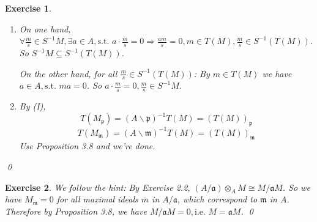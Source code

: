 \documentclass{article}
\theoremstyle{breakstyle}
\newtheorem{exercise}{Exercise}
\begin{document}
\begin{exercise}
    \leavevmode \vspace{-\baselineskip}
    \begin{enumerate}[label=({\Roman*})]
        \item 
            On one hand, $\forall \frac{m}{s}\in S^{-1}M,\exists a\in A,\text{s.t. }a\cdot \frac{m}{s}=0\Rightarrow \frac{am}{s}=0,m\in T(M),\frac{m}{s}\in S^{-1}(T(M))$.
            So $S^{-1}M\subseteq S^{-1}(T(M))$.

            On the other hand, for all $ \frac{m}{s}\in S^{-1}(T(M))$:
            By $m\in T(M)$ we have $a\in A,\text{s.t. }ma=0$.
            So $a\cdot \frac{m}{s}=0,\frac{m}{s}\in S^{-1}M$.
        \item 
            By \emph{(I)},
            $$
            T(M_{\mathfrak{p}})=(A\backslash \mathfrak{p})^{-1}T(M)=\left( T(M) \right) _{\mathfrak{p}}
            $$
            $$
            T(M_{\mathfrak{m}})=(A\backslash \mathfrak{m})^{-1}T(M)=\left( T(M) \right) _{\mathfrak{m}}
            $$
            Use \emph{Proposition 3.8} and we're done.
    \end{enumerate}
    \qed
\end{exercise}

\begin{exercise}
    We follow the hint:
    By \emph{Exercise 2.2}, $(A / \mathfrak{a})\otimes _{A}M\cong M / \mathfrak{a}M$.
    So we have $M_{\mathfrak{\overline{m}}}=0$ for all maximal ideals $\overline{m}$ in $A / \mathfrak{a}$, which correspond to $\mathfrak{m}$ in $A$.
    Therefore by \emph{Proposition 3.8}, we have $M / \mathfrak{a}M=0,\text{i.e. }M=\mathfrak{a}M$.
    \qed
\end{exercise}
\end{document}
